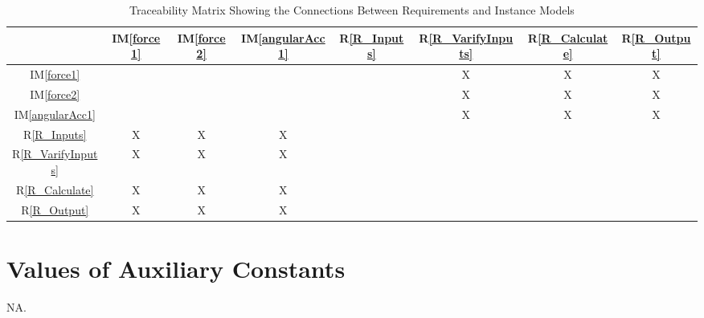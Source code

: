 \documentclass[12pt]{article}
\newcommand{\iref}[1]{IM\ref{#1}}
\newcommand{\rref}[1]{R\ref{#1}}
\begin{document}
\begin{table}[H]
\centering
\begin{tabular}{|c|c|c|c|c|c|c|c|}
\hline
  & \iref{force1}& \iref{force2}& \iref{angularAcc1}& \rref{R_Inputs}& \rref{R_VarifyInputs} &  \rref{R_Calculate} & \rref{R_Output}\\
\hline
\iref{force1}            &&&&&X&X&X \\ \hline
\iref{force2}            &&&&&X&X&X\\ \hline
\iref{angularAcc1}         &&&&&X&X&X\\ \hline
\rref{R_Inputs}         &X&X&X&&&&\\ \hline
\rref{R_VarifyInputs}         &X&X&X&&&&\\ \hline
\rref{R_Calculate}     &X&X&X&&&&\\ \hline
\rref{R_Output}    &X&X&X&&&&\\  
\hline
\end{tabular}
\caption{Traceability Matrix Showing the Connections Between Requirements and Instance Models}
\label{Table:R_trace}
\end{table}




\section{Values of Auxiliary Constants}\label{sec_auxConst}

NA.
\end{document}
